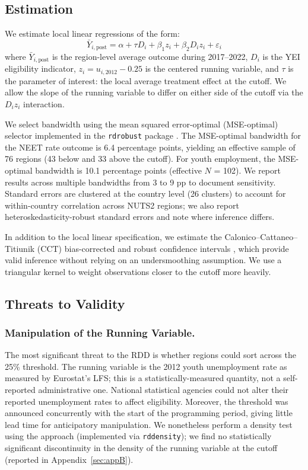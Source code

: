 \documentclass[12pt]{article}
\begin{document}
\subsection{Estimation}

We estimate local linear regressions of the form:
\begin{equation}
\bar{Y}_{i,\text{post}} = \alpha + \tau D_i + \beta_1 z_i + \beta_2 D_i z_i + \varepsilon_i
\end{equation}
where $\bar{Y}_{i,\text{post}}$ is the region-level average outcome during 2017--2022, $D_i$ is the YEI eligibility indicator, $z_i = u_{i,2012} - 0.25$ is the centered running variable, and $\tau$ is the parameter of interest: the local average treatment effect at the cutoff. We allow the slope of the running variable to differ on either side of the cutoff via the $D_i z_i$ interaction.

We select bandwidth using the \citet{cattaneo2020practical} mean squared error-optimal (MSE-optimal) selector implemented in the \texttt{rdrobust} package \citep{cattaneo2014robust}. The MSE-optimal bandwidth for the NEET rate outcome is 6.4 percentage points, yielding an effective sample of 76 regions (43 below and 33 above the cutoff). For youth employment, the MSE-optimal bandwidth is 10.1 percentage points (effective $N$ = 102). We report results across multiple bandwidths from 3 to 9 pp to document sensitivity. Standard errors are clustered at the country level (26 clusters) to account for within-country correlation across NUTS2 regions; we also report heteroskedasticity-robust standard errors and note where inference differs.

In addition to the local linear specification, we estimate the Calonico--Cattaneo--Titiunik (CCT) bias-corrected and robust confidence intervals \citep{cattaneo2014robust}, which provide valid inference without relying on an undersmoothing assumption. We use a triangular kernel to weight observations closer to the cutoff more heavily.

\subsection{Threats to Validity}

\subsubsection*{Manipulation of the Running Variable.} The most significant threat to the RDD is whether regions could sort across the 25\% threshold. The running variable is the 2012 youth unemployment rate as measured by Eurostat's LFS; this is a statistically-measured quantity, not a self-reported administrative one. National statistical agencies could not alter their reported unemployment rates to affect eligibility. Moreover, the threshold was announced concurrently with the start of the programming period, giving little lead time for anticipatory manipulation. We nonetheless perform a density test using the \citet{mccrary2008manipulation} approach (implemented via \texttt{rddensity}); we find no statistically significant discontinuity in the density of the running variable at the cutoff (reported in Appendix~\ref{sec:appB}).
\end{document}
